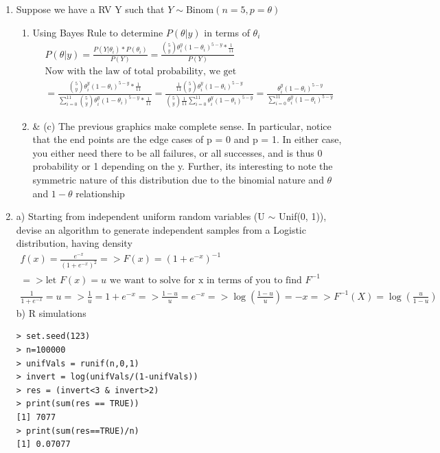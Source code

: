 \documentclass[11pt]{article}
\begin{document}
\begin{enumerate}
\begin{enumerate}
\end{enumerate}
\item Suppose we have a RV Y such that $Y \sim \text{Binom}(n=5,p = \theta)$
\begin{enumerate}
	\item Using Bayes Rule to determine $P(\theta | y)$ in terms of $\theta_i$
	\begin{gather}
		 P(\theta | y) = \frac{P(Y | \theta_i) * P(\theta_i)}{P(Y)} = \frac{\binom{5}{y} \theta_i^y(1-\theta_i)^{5-y} * \frac{1}{11}}{P(Y)}
		 \\
		 \text{Now with the law of total probability, we get}\\
		 = \frac{\binom{5}{y} \theta_i^y(1-\theta_i)^{5-y} * \frac{1}{11}}{\sum_{i=0}^{11}\binom{5}{y} \theta_i^y(1-\theta_i)^{5-y} * \frac{1}{11}} = \frac{\frac{1}{11}\binom{5}{y} \theta_i^y(1-\theta_i)^{5-y}}{\binom{5}{y} \frac{1}{11}\sum_{i=0}^{11} \theta_i^y(1-\theta_i)^{5-y}} = \frac{ \theta_i^y(1-\theta_i)^{5-y}}{\sum_{i=0}^{11} \theta_i^y(1-\theta_i)^{5-y}}
	\end{gather}
	\item \& (c)
	The previous graphics make complete sense. In particular, notice that the end points are the edge cases of p = 0 and p = 1. In either case, you either need there to be all failures, or all successes, and is thus 0 probability or 1 depending on the y.
	Further, its interesting to note the symmetric nature of this distribution due to the binomial nature and  $\theta$ and $1-\theta$ relationship
\end{enumerate}
\item a) Starting from independent uniform random variables (U $\sim$ Unif(0, 1)), devise an algorithm to generate independent samples from a Logistic distribution, having density
\begin{gather}
	f(x) = \frac{e^{-x}}{(1+e^{-x})^2} => F(x) = (1+e^{-x})^{-1}\\
	=> \text{let } F(x) = u \text{ we want to solve for x in terms of you to find  } F^{-1} \\
	\frac{1}{1+e^{-x}} = u => \frac{1}{u} = 1+e^{-x} => \frac{1-u}{u} = e^{-x} => \log(\frac{1-u}{u}) = -x => F^{-1}(X) = \log(\frac{u}{1-u})
\end{gather}
b) R simulations
\begin{verbatim}
> set.seed(123)
> n=100000
> unifVals = runif(n,0,1)
> invert = log(unifVals/(1-unifVals))
> res = (invert<3 & invert>2)
> print(sum(res == TRUE))
[1] 7077
> print(sum(res==TRUE)/n)
[1] 0.07077
\end{verbatim}
\end{enumerate}
\end{document}
